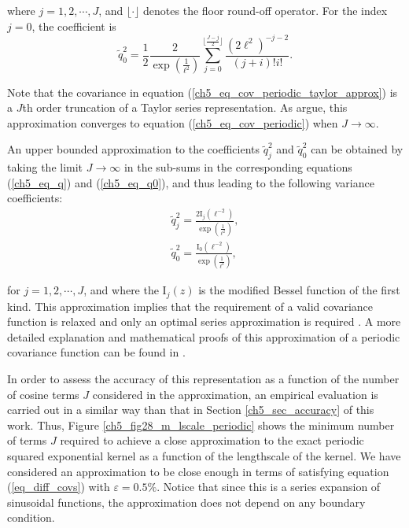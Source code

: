 \documentclass[onecolumn,a4paper,11pt]{article}
\begin{document}
\noindent where $j=1,2,\cdots,J$, and $\lfloor \cdot \rfloor$ denotes the floor round-off operator. For the index $j=0$, the coefficient is 
%
\begin{equation} \label{ch5_eq_q0}
\tilde{q}_0^2= \frac{1}{2} \frac{2}{\exp(\frac{1}{\ell^2})} \sum_{j=0}^{\lfloor \frac{J-j}{2} \rfloor} \frac{(2\ell^2)^{-j-2}}{(j+i)!i!}.
\end{equation}
 
\noindent Note that the covariance in equation (\ref{ch5_eq_cov_periodic_taylor_approx}) is a $J$th order truncation of a Taylor series representation. As \cite{solin2014explicit} argue, this approximation converges to equation (\ref{ch5_eq_cov_periodic}) when $J \rightarrow \infty$.

An upper bounded approximation to the coefficients $\tilde{q}_j^2$ and $\tilde{q}_0^2$ can be obtained by taking the limit $J \rightarrow \infty$ in the sub-sums in the corresponding equations (\ref{ch5_eq_q}) and (\ref{ch5_eq_q0}), and thus leading to the following variance coefficients:
%
\begin{equation}\label{ch5_eq_q_2}
\begin{split}
\tilde{q}_j^2= \frac{2\text{I}_j(\ell^{-2})}{\exp(\frac{1}{\ell^2})}, \\
\tilde{q}_0^2= \frac{\text{I}_0(\ell^{-2})}{\exp(\frac{1}{\ell^2})},
\end{split}
\end{equation} 

\noindent for $j=1,2,\cdots,J$, and where the $\text{I}_{j}(z)$ is the modified Bessel function \citep{handbook1970m} of the first kind. This approximation implies that the requirement of a valid covariance function is relaxed and only an optimal series approximation is required \citep{solin2014explicit}. A more detailed explanation and mathematical proofs of this approximation of a periodic covariance function can be found in \cite{solin2014explicit}. 



In order to assess the accuracy of this representation as a function of the number of cosine terms $J$ considered in the approximation, an empirical evaluation is carried out in a similar way than that in Section \ref{ch5_sec_accuracy} of this work. Thus, Figure \ref{ch5_fig28_m_lscale_periodic} shows the minimum number of terms $J$ required to achieve a close approximation to the exact periodic squared exponential kernel as a function of the lengthscale of the kernel. We have considered an approximation to be close enough in terms of satisfying equation (\ref{eq_diff_covs}) with $\varepsilon=0.5\%$. Notice that since this is a series expansion of sinusoidal functions, the approximation does not depend on any boundary condition.
\end{document}
